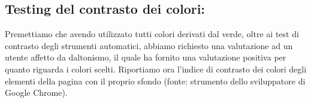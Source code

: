 \subsection{Testing del contrasto dei colori:}
Premettiamo che avendo utilizzato tutti colori derivati dal verde, oltre ai test di contrasto degli strumenti automatici, abbiamo richiesto una valutazione ad un utente affetto da daltonismo, il quale ha fornito una valutazione positiva per quanto riguarda i colori scelti.
Riportiamo ora l'indice di contrasto dei colori degli elementi della pagina con il proprio sfondo (fonte: strumento dello sviluppatore di Google Chrome).
